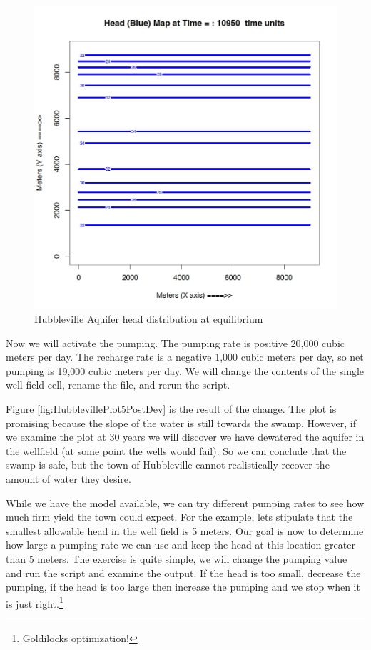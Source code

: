 \begin{figure}[h!] %
   \centering
   \includegraphics[width=6in]{./18-UnsteadyGroundwaterFlow/HubblevillePlot30PreDev.jpg} 
   \caption{Hubbleville Aquifer head distribution at equilibrium}
   \label{fig:HubblevillePlot30PreDev}
\end{figure}

Now we will activate the pumping.  
The pumping rate is positive 20,000 cubic meters per day.  
The recharge rate is a negative 1,000 cubic meters per day, so net pumping is 19,000 cubic meters per day.
We will change the contents of the single well field cell, rename the file, and rerun the script.

Figure \ref{fig:HubblevillePlot5PostDev} is the result of the change.
The plot is promising because the slope of the water is still towards the swamp.
However, if we examine the plot at 30 years we will discover we have dewatered the aquifer in the wellfield (at some point the wells would fail).
So we can conclude that the swamp is safe, but the town of Hubbleville cannot realistically recover the amount of water they desire.

While we have the model available, we can try different pumping rates to see how much firm yield the town could expect.
For the example, lets stipulate that the smallest allowable head in the well field is 5 meters.
Our goal is now to determine how large a pumping rate we can use and keep the head at this location greater than 5 meters.
The exercise is quite simple, we will change the pumping value and run the script and examine the output.  
If the head is too small, decrease the pumping, if the head is too large then increase the pumping and we stop when it is just right.\footnote{Goldilocks optimization!}

